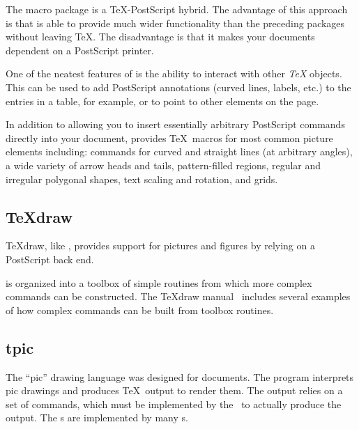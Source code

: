   The \product{\PSTricks} macro package is a \TeX-PostScript hybrid.  The advantage of
  this approach is that \product{\PSTricks} is able to provide much wider functionality
  than the preceding packages without leaving \TeX.  The disadvantage is that
  it makes your documents dependent on a PostScript printer.

  One of the neatest features of \product{\PSTricks} is the ability to interact with
  other {\em \TeX} objects.  This can be used to add PostScript annotations
  (curved lines, labels, etc.) to the entries in a table, for example,
  or to point to other elements on the page.
\fi

In addition to allowing you to insert essentially arbitrary PostScript
commands directly into your document, \product{\PSTricks} provides \TeX\ macros for
most common picture elements including: commands for curved and straight
lines (at arbitrary angles), a wide variety of arrow heads and tails, 
pattern-filled regions, regular and irregular polygonal shapes, text scaling and
rotation, and grids.

\subsection{\protect\TeX{}draw}

\TeX{}draw, like \product{\PSTricks}, provides support for pictures and figures
by relying on a PostScript back end.  

 is 
organized into a toolbox of simple routines from which
more complex commands can be constructed.  
The \TeX{}draw manual~\cite{pk:texdraw}
includes several examples of how complex commands can be built from
toolbox routines.

\subsection{tpic}
\label{sec:tpic}

The ``pic'' 
drawing language was designed for  documents.
The  program interprets pic drawings and produces \TeX\
output to render them.  The output relies on a set of 
commands, which must be implemented by the \dvidriver\ to actually
produce the output.  The \program{tpic} \cs{special}s are implemented
by many \dvidriver{}s.

